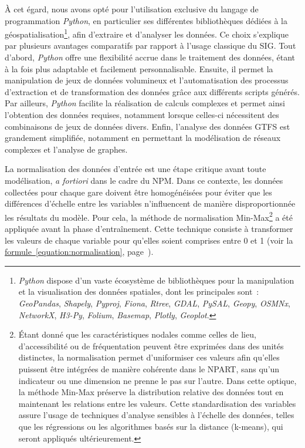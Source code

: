 \begin{refsegment}
À cet égard, nous avons opté pour l'utilisation exclusive du langage de programmation \textsl{Python}, en particulier ses différentes bibliothèques dédiées à la géospatialisation\footnote{
    \textsl{Python} dispose d'un vaste écosystème de bibliothèques pour la manipulation et la visualisation des données spatiales, dont les principales sont~: \textsl{GeoPandas}, \textsl{Shapely}, \textsl{Pyproj}, \textsl{Fiona}, \textsl{Rtree}, \textsl{GDAL}, \textsl{PySAL}, \textsl{Geopy}, \textsl{OSMNx}, \textsl{NetworkX}, \textsl{H3-Py}, \textsl{Folium}, \textsl{Basemap}, \textsl{Plotly}, \textsl{Geoplot}.
}, afin d'extraire et d'analyser les données. Ce choix s'explique par plusieurs avantages comparatifs par rapport à l'usage classique du \acrfull{SIG}. Tout d'abord, \textsl{Python} offre une flexibilité accrue dans le traitement des données, étant à la fois plus adaptable et facilement personnalisable. Ensuite, il permet la manipulation de jeux de données volumineux et l'automatisation des processus d'extraction et de transformation des données grâce aux différents scripts générés. Par ailleurs, \textsl{Python} facilite la réalisation de calculs complexes et permet ainsi l'obtention des données requises, notamment lorsque celles-ci nécessitent des combinaisons de jeux de données divers. Enfin, l'analyse des données \acrshort{GTFS} est grandement simplifiée, notamment en permettant la modélisation de réseaux complexes et l'analyse de graphes.%

La normalisation des données d'entrée est une étape critique avant toute modélisation, \textsl{a fortiori} dans le cadre du \acrshort{NPM}. Dans ce contexte, les données collectées pour chaque gare doivent être homogénéisées pour éviter que les différences d'échelle entre les variables n'influencent de manière disproportionnée les résultats du modèle. Pour cela, la méthode de normalisation Min-Max\footnote{
    Étant donné que les caractéristiques nodales comme celles de lieu, d'accessibilité ou de fréquentation peuvent être exprimées dans des unités distinctes, la normalisation permet d'uniformiser ces valeurs afin qu'elles puissent être intégrées de manière cohérente dans le \acrshort{NPART}, sans qu'un indicateur ou une dimension ne prenne le pas sur l'autre. Dans cette optique, la méthode Min-Max préserve la distribution relative des données tout en maintenant les relations entre les valeurs. Cette standardisation des variables assure l'usage de techniques d'analyse sensibles à l'échelle des données, telles que les régressions ou les algorithmes basés sur la distance (k-means), qui seront appliqués ultérieurement.
} a été appliquée avant la phase d'entraînement. Cette technique consiste à transformer les valeurs de chaque variable pour qu'elles soient comprises entre 0 et 1 (voir la \hyperref[equation:normalisation]{formule~\ref{equation:normalisation}}, page~\pageref{equation:normalisation}).%


\end{refsegment}
